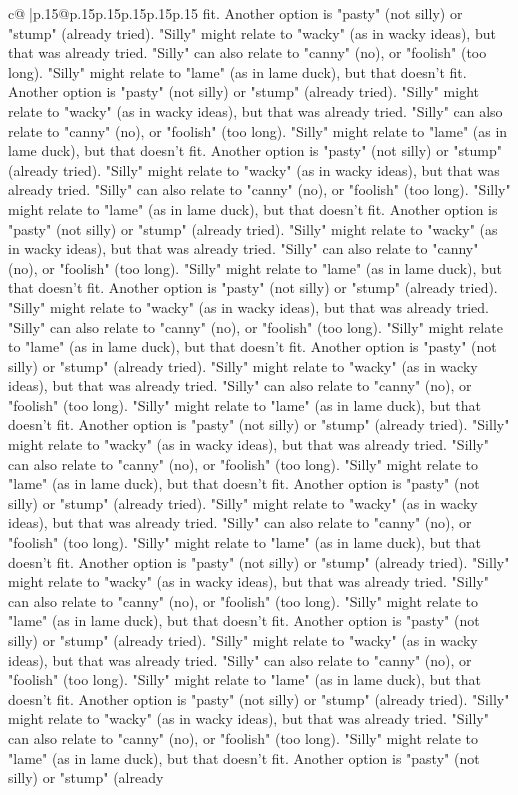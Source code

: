 \documentclass{article}
\begin{document}
{\begin{supertabular}{c@{$\;$}|p{.15\linewidth}@{}p{.15\linewidth}p{.15\linewidth}p{.15\linewidth}p{.15\linewidth}p{.15\linewidth}}
{{{fit. Another option is "pasty" (not silly) or "stump" (already tried). "Silly" might relate to "wacky" (as in wacky ideas), but that was already tried. "Silly" can also relate to "canny" (no), or "foolish" (too long). "Silly" might relate to "lame" (as in lame duck), but that doesn't fit. Another option is "pasty" (not silly) or "stump" (already tried). "Silly" might relate to "wacky" (as in wacky ideas), but that was already tried. "Silly" can also relate to "canny" (no), or "foolish" (too long). "Silly" might relate to "lame" (as in lame duck), but that doesn't fit. Another option is "pasty" (not silly) or "stump" (already tried). "Silly" might relate to "wacky" (as in wacky ideas), but that was already tried. "Silly" can also relate to "canny" (no), or "foolish" (too long). "Silly" might relate to "lame" (as in lame duck), but that doesn't fit. Another option is "pasty" (not silly) or "stump" (already tried). "Silly" might relate to "wacky" (as in wacky ideas), but that was already tried. "Silly" can also relate to "canny" (no), or "foolish" (too long). "Silly" might relate to "lame" (as in lame duck), but that doesn't fit. Another option is "pasty" (not silly) or "stump" (already tried). "Silly" might relate to "wacky" (as in wacky ideas), but that was already tried. "Silly" can also relate to "canny" (no), or "foolish" (too long). "Silly" might relate to "lame" (as in lame duck), but that doesn't fit. Another option is "pasty" (not silly) or "stump" (already tried). "Silly" might relate to "wacky" (as in wacky ideas), but that was already tried. "Silly" can also relate to "canny" (no), or "foolish" (too long). "Silly" might relate to "lame" (as in lame duck), but that doesn't fit. Another option is "pasty" (not silly) or "stump" (already tried). "Silly" might relate to "wacky" (as in wacky ideas), but that was already tried. "Silly" can also relate to "canny" (no), or "foolish" (too long). "Silly" might relate to "lame" (as in lame duck), but that doesn't fit. Another option is "pasty" (not silly) or "stump" (already tried). "Silly" might relate to "wacky" (as in wacky ideas), but that was already tried. "Silly" can also relate to "canny" (no), or "foolish" (too long). "Silly" might relate to "lame" (as in lame duck), but that doesn't fit. Another option is "pasty" (not silly) or "stump" (already tried). "Silly" might relate to "wacky" (as in wacky ideas), but that was already tried. "Silly" can also relate to "canny" (no), or "foolish" (too long). "Silly" might relate to "lame" (as in lame duck), but that doesn't fit. Another option is "pasty" (not silly) or "stump" (already tried). "Silly" might relate to "wacky" (as in wacky ideas), but that was already tried. "Silly" can also relate to "canny" (no), or "foolish" (too long). "Silly" might relate to "lame" (as in lame duck), but that doesn't fit. Another option is "pasty" (not silly) or "stump" (already tried). "Silly" might relate to "wacky" (as in wacky ideas), but that was already tried. "Silly" can also relate to "canny" (no), or "foolish" (too long). "Silly" might relate to "lame" (as in lame duck), but that doesn't fit. Another option is "pasty" (not silly) or "stump" (already }}}
\end{supertabular}}
\end{document}

